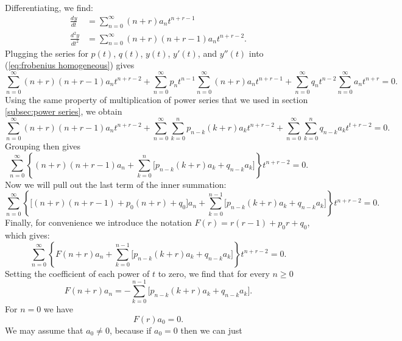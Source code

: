 \documentclass{myart}
\newcommand{\eq}[1]{(\ref{eq:#1})}
\newcommand{\deriv}[3][]{\frac{d^{#1}#2}{d#3^{#1}}}
\begin{document}
Differentiating, we find:
\begin{align*}
  \deriv{y}{t} &= \sum_{n=0}^\infty (n+r) a_n t^{n+r-1} \\
  \deriv[2]{y}{t} &= \sum_{n=0}^\infty (n+r)(n+r-1) a_n t^{n+r-2}.
\end{align*}
Plugging the series for $p(t)$, $q(t)$, $y(t)$, $y'(t)$, and $y''(t)$
into \eq{frobenius homogeneous} gives
\begin{equation*}
    \sum_{n=0}^\infty (n+r)(n+r-1) a_n t^{n+r-2}
  + \sum_{n=0}^\infty p_n t^{n-1} \sum_{n=0}^\infty (n+r) a_n t^{n+r-1}
  + \sum_{n=0}^\infty q_n t^{n-2} \sum_{n=0}^\infty       a_n t^{n+r}
  = 0.
\end{equation*}
Using the same property of multiplication of power series that we used
in section \ref{subsec:power series}, we obtain
\begin{equation*}
    \sum_{n=0}^\infty (n+r)(n+r-1) a_n t^{n+r-2}
  + \sum_{n=0}^\infty \sum_{k=0}^n p_{n-k} (k+r) a_k t^{n+r-2}
  + \sum_{n=0}^\infty \sum_{k=0}^n q_{n-k} a_k t^{t+r-2}
  = 0.
\end{equation*}
Grouping then gives
\begin{equation*}
  \sum_{n=0}^\infty \left\{
      (n+r)(n+r-1) a_n
    + \sum_{k=0}^n \Big[p_{n-k} (k+r) a_k + q_{n-k} a_k\Big]
  \right\} t^{n+r-2} = 0.
\end{equation*}
Now we will pull out the last term of the inner summation:
\begin{equation*}
  \sum_{n=0}^\infty \left\{
      \Big[(n+r)(n+r-1) + p_0 (n+r) + q_0\Big] a_n
    + \sum_{k=0}^{n-1} \Big[p_{n-k} (k+r) a_k + q_{n-k} a_k\Big]
  \right\} t^{n+r-2} = 0.
\end{equation*}
Finally, for convenience we introduce the notation $F(r) = r(r-1) +
p_0r + q_0$, which gives:
\begin{equation} \label{eq:frobenius lhs}
  \sum_{n=0}^\infty \left\{
      F(n + r) a_n
    + \sum_{k=0}^{n-1} \Big[p_{n-k} (k+r) a_k + q_{n-k} a_k\Big]
  \right\} t^{n+r-2} = 0.
\end{equation}
Setting the coefficient of each power of $t$ to zero, we find that for
every $n \geq 0$
\begin{equation} \label{eq:frobenius coefficients unsolved}
    F(n+r) a_n
  = -\sum_{k=0}^{n-1} \Big[p_{n-k} (k+r) a_k + q_{n-k} a_k\Big].
\end{equation}
For $n = 0$ we have
\begin{equation*}
  F(r) a_0 = 0.
\end{equation*}
We may assume that $a_0 \neq 0$, because if $a_0 = 0$ then we can just
\end{document}
